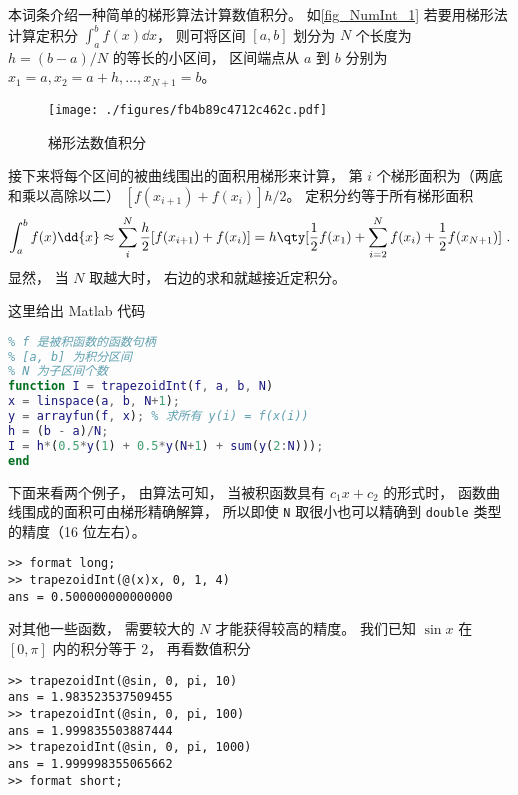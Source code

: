 

本词条介绍一种简单的梯形算法计算数值积分。 如\autoref{fig_NumInt_1} 若要用梯形法计算定积分 $\int_a^b f(x) \dd{x}$， 则可将区间 $[a, b]$ 划分为 $N$ 个长度为 $h = (b-a)/N$ 的等长的小区间， 区间端点从 $a$ 到 $b$ 分别为 $x_1 = a, x_2 = a + h, \dots, x_{N+1} = b$。

\begin{figure}[ht]
\centering
\texttt{[image: ./figures/fb4b89c4712c462c.pdf]}
\caption{梯形法数值积分} \label{fig_NumInt_1}
\end{figure}

接下来将每个区间的被曲线围出的面积用梯形来计算， 第 $i$ 个梯形面积为（两底和乘以高除以二）
$[f(x_{i+1}) + f(x_i)]h/2$。 定积分约等于所有梯形面积
\begin{equation}\label{eq_NumInt_1}
\int_a^b f(x) \dd{x} \approx \sum_i^N  \frac h2 [f(x_{i+1}) + f(x_i)]
= h\qty[ \frac12 f(x_1) + \sum_{i = 2}^N f(x_i) + \frac12 f(x_{N+1})]~.
\end{equation}
显然， 当 $N$ 取越大时， 右边的求和就越接近定积分。

这里给出 Matlab 代码

\begin{lstlisting}[language=matlab, caption=trapezoidInt.m]
% 梯形法数值积分
% f 是被积函数的函数句柄
% [a, b] 为积分区间
% N 为子区间个数
function I = trapezoidInt(f, a, b, N)
x = linspace(a, b, N+1);
y = arrayfun(f, x); % 求所有 y(i) = f(x(i))
h = (b - a)/N;
I = h*(0.5*y(1) + 0.5*y(N+1) + sum(y(2:N)));
end
\end{lstlisting}

下面来看两个例子， 由算法可知， 当被积函数具有 $c_1 x + c_2$ 的形式时， 函数曲线围成的面积可由梯形精确解算， 所以即使 \verb|N| 取很小也可以精确到 \verb|double| 类型的精度（16 位左右）。
\begin{lstlisting}[language=matlabC]
>> format long;
>> trapezoidInt(@(x)x, 0, 1, 4)
ans = 0.500000000000000
\end{lstlisting}
对其他一些函数， 需要较大的 $N$ 才能获得较高的精度。 我们已知 $\sin x$ 在 $[0, \pi]$ 内的积分等于 $2$， 再看数值积分
\begin{lstlisting}[language=matlabC]
>> trapezoidInt(@sin, 0, pi, 10)
ans = 1.983523537509455
>> trapezoidInt(@sin, 0, pi, 100)
ans = 1.999835503887444
>> trapezoidInt(@sin, 0, pi, 1000)
ans = 1.999998355065662
>> format short;
\end{lstlisting}
